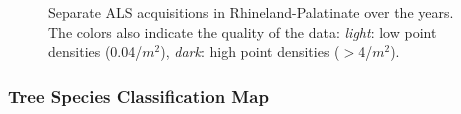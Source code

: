 \begin{figure}[H]
	\centering
	\caption{Separate ALS acquisitions in Rhineland-Palatinate over the years. The colors also indicate the quality of the data: \textit{light}: low point densities (0.04/$m^2$), \textit{dark}: high point densities ($>$4/$m^2$). }
	\label{abb:lidaryears}
\end{figure}



\subsubsection{Tree Species Classification Map}
\label{sec:tspecclass}

